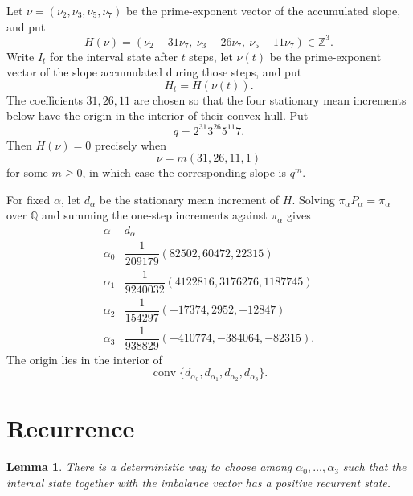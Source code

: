 \documentclass[11pt]{article}
\newtheorem{lemma}[theorem]{Lemma}
\newcommand{\Z}{\mathbb{Z}}
\begin{document}
Let $\nu=(\nu_2,\nu_3,\nu_5,\nu_7)$ be the prime-exponent vector of the accumulated slope, and put
\[
H(\nu)=(\nu_2-31\nu_7,\ \nu_3-26\nu_7,\ \nu_5-11\nu_7)\in\Z^3.
\]
Write $I_t$ for the interval state after $t$ steps, let $\nu(t)$ be the prime-exponent vector of the slope accumulated during those steps, and put
\[
H_t=H(\nu(t)).
\]
The coefficients $31,26,11$ are chosen so that the four stationary mean increments below have the origin in the interior of their convex hull. Put
\[
q=2^{31}3^{26}5^{11}7.
\]
Then $H(\nu)=0$ precisely when
\[
\nu=m(31,26,11,1)
\]
for some $m\geq0$, in which case the corresponding slope is $q^m$.

For fixed $\alpha$, let $d_\alpha$ be the stationary mean increment of $H$. Solving $\pi_\alpha P_\alpha=\pi_\alpha$ over $\mathbb Q$ and summing the one-step increments against $\pi_\alpha$ gives
\[
\begin{array}{c|c}
\alpha & d_\alpha \\ \hline
\alpha_0 & \dfrac1{209179}(82502,60472,22315)\\[1ex]
\alpha_1 & \dfrac1{9240032}(4122816,3176276,1187745)\\[1ex]
\alpha_2 & \dfrac1{154297}(-17374,2952,-12847)\\[1ex]
\alpha_3 & \dfrac1{938829}(-410774,-384064,-82315).
\end{array}
\]
The origin lies in the interior of
\[
\operatorname{conv}\{d_{\alpha_0},d_{\alpha_1},d_{\alpha_2},d_{\alpha_3}\}.
\]

\section{Recurrence}

\begin{lemma}\label{lem:recurrence}
There is a deterministic way to choose among $\alpha_0,\ldots,\alpha_3$ such that the interval state together with the imbalance vector has a positive recurrent state.
\end{lemma}
\end{document}
